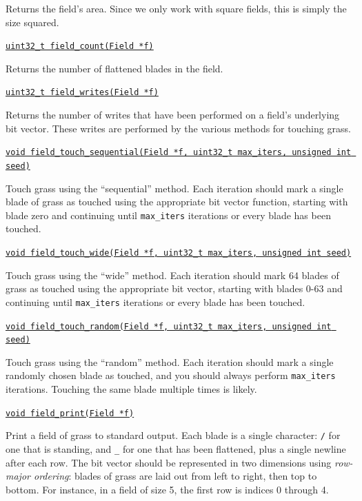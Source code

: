 \documentclass[11pt]{article}
\begin{document}
Returns the field's area. Since we only work with square fields, this is simply the size squared.
\medskip

\underline{\texttt{uint32\_t field\_count(Field *f)}}

Returns the number of flattened blades in the field.
\medskip

\underline{\texttt{uint32\_t field\_writes(Field *f)}}

Returns the number of writes that have been performed on a field's underlying bit vector. These writes are performed by the various methods for touching grass.
\medskip

\underline{\texttt{void field\_touch\_sequential(Field *f, uint32\_t max\_iters, unsigned int seed)}}

Touch grass using the ``sequential'' method. Each iteration should mark a single blade of grass as touched using the appropriate bit vector function, starting with blade zero and continuing until \texttt{max\_iters} iterations or every blade has been touched.
\medskip

\underline{\texttt{void field\_touch\_wide(Field *f, uint32\_t max\_iters, unsigned int seed)}}

Touch grass using the ``wide'' method. Each iteration should mark 64 blades of grass as touched using the appropriate bit vector, starting with blades 0-63 and continuing until \texttt{max\_iters} iterations or every blade has been touched.
\medskip

\underline{\texttt{void field\_touch\_random(Field *f, uint32\_t max\_iters, unsigned int seed)}}

Touch grass using the ``random'' method. Each iteration should mark a single randomly chosen blade as touched, and you should always perform \texttt{max\_iters} iterations. Touching the same blade multiple times is likely.
\medskip

\underline{\texttt{void field\_print(Field *f)}}

Print a field of grass to standard output. Each blade is a single character: \texttt{/} for one that is standing, and \texttt{\_} for one that has been flattened, plus a single newline after each row. The bit vector should be represented in two dimensions using \emph{row-major ordering}: blades of grass are laid out from left to right, then top to bottom. For instance, in a field of size 5, the first row is indices 0 through 4.

\setlength{\parindent}{17pt}
\setlength{\parskip}{0pt plus1pt}
\end{document}
